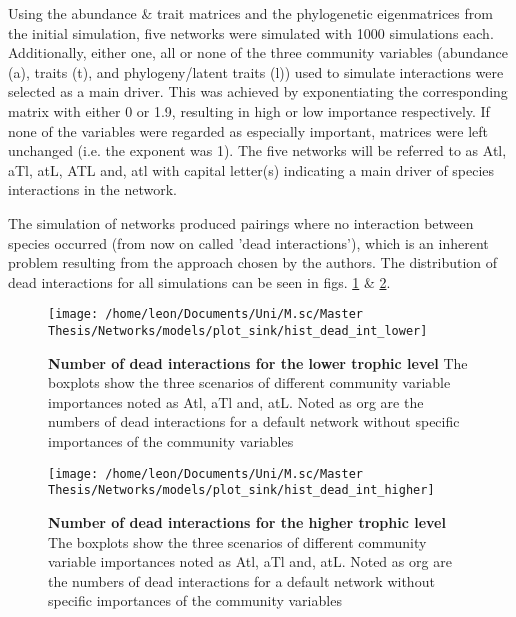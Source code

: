 \documentclass[12pt,a4paper]{article}
\begin{document}
	Using the abundance \& trait matrices and the phylogenetic eigenmatrices from the initial simulation, five networks were simulated with 1000 simulations each. Additionally, either one, all or none of the three community variables (abundance (a), traits (t), and phylogeny/latent traits (l)) used to simulate interactions were selected as a main driver. This was achieved by exponentiating the corresponding matrix with either 0 or 1.9, resulting in high or low importance respectively. If none of the variables were regarded as especially important, matrices were left unchanged (i.e. the exponent was 1). The five networks will be referred to as Atl, aTl, atL, ATL and, atl with capital letter(s) indicating a main driver of species interactions in the network.
	
	 The simulation of networks produced pairings where no interaction between species occurred (from now on called 'dead interactions'), which is an inherent problem resulting from the approach chosen by the authors. The distribution of dead interactions for all simulations can be seen in figs. \ref{dead_int_low} \& \ref{dead_int_high}. 

\begin{figure}[H]
	 \texttt{[image: /home/leon/Documents/Uni/M.sc/Master Thesis/Networks/models/plot\_sink/hist\_dead\_int\_lower]}
	 \caption{\textbf{Number of dead interactions for the lower trophic level} The boxplots show the three scenarios of different community variable importances noted as Atl, aTl and, atL. Noted as org are the numbers of dead interactions for a default network without specific importances of the community variables}
	 \label{dead_int_low}
\end{figure}

\begin{figure}[H]
	 \texttt{[image: /home/leon/Documents/Uni/M.sc/Master Thesis/Networks/models/plot\_sink/hist\_dead\_int\_higher]}
	 \caption{\textbf{Number of dead interactions for the higher trophic level} The boxplots show the three scenarios of different community variable importances noted as Atl, aTl and, atL. Noted as org are the numbers of dead interactions for a default network without specific importances of the community variables}
	 \label{dead_int_high}
\end{figure}

\end{document}
